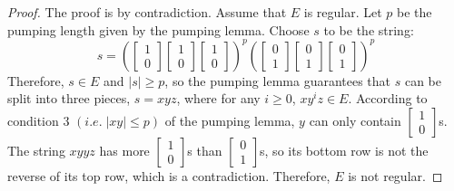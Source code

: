 \documentclass[11pt]{article}
\begin{document}
\begin{proof}
The proof is by contradiction. Assume that $E$ is regular. Let $p$ be the pumping length given by the pumping lemma. Choose $s$ to be the string:
\[
s = 
\left(
\begin{bmatrix}
    1 \\
    0
\end{bmatrix}
\begin{bmatrix}
    1 \\
    0
\end{bmatrix}
\begin{bmatrix}
    1 \\
    0
\end{bmatrix}
\right)^{p}
\left(
\begin{bmatrix}
    0 \\
    1
\end{bmatrix}
\begin{bmatrix}
    0 \\
    1
\end{bmatrix}
\begin{bmatrix}
    0 \\
    1
\end{bmatrix}
\right)^{p}
\]
Therefore, $s \in E$ and $|s| \geq p$, so the pumping lemma guarantees that $s$ can be split into three pieces, $s = xyz$, where for any $i \geq 0$, $xy^{i}z \in E$. According to condition 3 $(i.e. \; |xy| \leq p)$ of the pumping lemma, $y$ can only contain $\begin{bmatrix}1 \\ 0\end{bmatrix}$s. The string $xyyz$ has more $\begin{bmatrix}1 \\ 0\end{bmatrix}$s than $\begin{bmatrix}0 \\ 1\end{bmatrix}$s, so its bottom row is not the reverse of its top row, which is a contradiction. Therefore, $E$ is not regular.
\end{proof}
\end{document}
